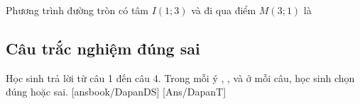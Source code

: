 \begin{ex}%
	Phương trình đường tròn có tâm $I(1;3)$ và đi qua điểm $M(3;1)$ là
\end{ex}
  

\subsection{Câu trắc nghiệm đúng sai}
Học sinh trả lời từ câu 1 đến câu 4.
Trong mỗi ý , ,  và  ở mỗi câu, học sinh chọn đúng hoặc sai.
\setcounter{ex}{0}
\LGexTF
{}[ansbook/DapanDS]
[Ans/DapanT]
